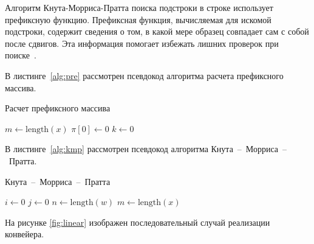 Алгоритм Кнута-Морриса-Пратта поиска подстроки в строке использует префиксную функцию. 
Префиксная функция, вычисляемая для искомой подстроки, содержит сведения о том, в какой мере образец совпадает сам с собой после сдвигов. 
Эта информация помогает избежать лишних проверок при поиске~\cite{алексеенко2010информационная}.

В листинге~\ref{alg:pre} рассмотрен псевдокод алгоритма расчета префиксного массива.

\begin{algorithm}[H]
	\caption{Расчет префиксного массива}
	\label{alg:pre}
	\SetAlgoLined
	$m \gets \text{length}(x)$\;
	$\pi[0] \gets 0$\;
	$k \gets 0$\;
	\KwRet{$\pi$}\;
\end{algorithm}

\newpage
В листинге~\ref{alg:kmp} рассмотрен псевдокод алгоритма Кнута~--~Морриса~--~Пратта.

\begin{algorithm}[H]
	\caption{Кнута~--~Морриса~--~Пратта}
	\label{alg:kmp}
	\SetAlgoLined
	$i \gets 0$\;
	$j \gets 0$\;
	$n \gets \text{length}(w)$\;
	$m \gets \text{length}(x)$\;
	\;
\end{algorithm}
\newpage

На рисунке \ref{fig:linear} изображен последовательный случай реализации конвейера.

